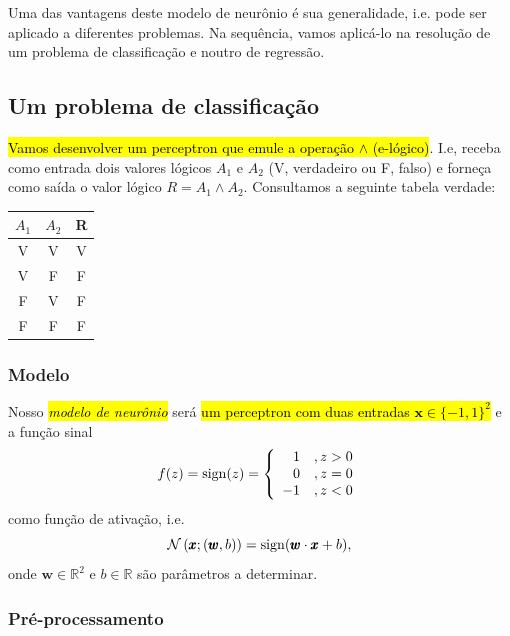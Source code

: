 Uma das vantagens deste modelo de neurônio é sua generalidade, i.e. pode ser aplicado a diferentes problemas. Na sequência, vamos aplicá-lo na resolução de um problema de classificação e noutro de regressão.


\subsection{Um problema de classificação}\label{cap_perceptron_ssec_classic}

\hl{Vamos desenvolver um perceptron que emule a operação $\land$ (e-lógico)}. I.e, receba como entrada dois valores lógicos $A_1$ e $A_2$ (V, verdadeiro ou F, falso) e forneça como saída o valor lógico $R = A_1 \land A_2$. Consultamos a seguinte tabela verdade:

\begin{center}
  \begin{tabular}{cc|c}
    $A_1$ & $A_2$ & R\\\hline
    V & V & V\\
    V & F & F\\
    F & V & F\\
    F & F & F\\\hline
  \end{tabular}
\end{center}


\subsubsection{Modelo}

Nosso \hl{\emph{modelo de neurônio}} será \hl{um perceptron com duas entradas $\pmb{x}\in \{-1,1\}^2$} e a função sinal
\begin{equation}
  f(z) = \operatorname{sign}(z) = \left\{
    \begin{array}{rr}
      1 &, z>0\\
      0 &, z=0\\
      -1 &, z<0
    \end{array}
\right.
\end{equation}
como função de ativação, i.e.
\begin{equation}
  \mathcal{N}\left(\pmb{x};(\pmb{w},b)\right) = \operatorname{sign}(\pmb{w}\cdot\pmb{x} + b),
\end{equation}
onde $\pmb{w}\in\mathbb{R}^2$ e $b\in\mathbb{R}$ são parâmetros a determinar.


\subsubsection{Pré-processamento}

